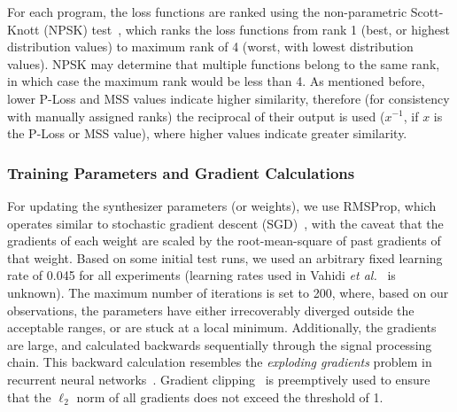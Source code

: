 \documentclass[lettersize,journal]{IEEEtran}
\providecommand{\gls}[1]{#1}
\begin{document}
For each program, the loss functions are ranked using the non-parametric Scott-Knott (\gls{NPSK}) test~\cite{tantithamthavorn2017mvt,tantithamthavorn2018optimization}, which ranks the loss functions from rank 1 (best, or highest distribution values) to maximum rank of 4 (worst, with lowest distribution values). NPSK may determine that multiple functions belong to the same rank, in which case the maximum rank would be less than 4. As mentioned before, lower P-Loss and MSS values indicate higher similarity, therefore (for consistency with manually assigned ranks) the reciprocal of their output is used ($x^{-1}$, if $x$ is the P-Loss or MSS value), where higher values indicate greater similarity. 



\subsubsection{Training Parameters and Gradient Calculations}
 For updating the synthesizer parameters (or weights), we use RMSProp, which operates similar to stochastic gradient descent (SGD)~\cite{goodfellow2016deep}, with the caveat that the gradients of each weight are scaled by the root-mean-square of past gradients of that weight. Based on some initial test runs, we used an arbitrary fixed learning rate of 0.045 for all experiments (learning rates used in Vahidi \textit{et al.}~\cite{vahidi2023mesostructures} is unknown). The maximum number of iterations is set to 200, where, based on our observations, the parameters have either irrecoverably diverged outside the acceptable ranges, or are stuck at a local minimum. Additionally, the gradients are large, and calculated backwards sequentially through the signal processing chain. This backward calculation resembles the \textit{exploding gradients} problem in recurrent neural networks~\cite{gers2000learning}. Gradient clipping~\cite{goodfellow2016deep} is preemptively used to ensure that the  $\ell_2$ norm of all gradients does not exceed the threshold of 1. 
\end{document}
